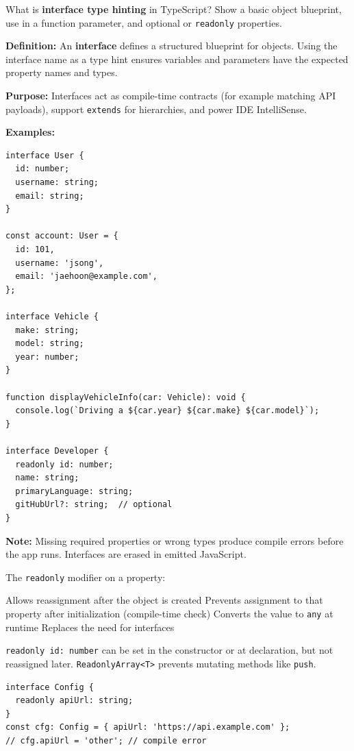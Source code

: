 \question[6]
What is \textbf{interface type hinting} in TypeScript? Show a basic object blueprint, use in a function parameter, and optional or \lstinline[style=tsinline]|readonly| properties.
\begin{solutionorbox}[5in]
\textbf{Definition:} An \textbf{interface} defines a structured blueprint for objects. Using the interface name as a type hint ensures variables and parameters have the expected property names and types.

\textbf{Purpose:} Interfaces act as compile-time contracts (for example matching API payloads), support \lstinline[style=tsinline]|extends| for hierarchies, and power IDE IntelliSense.

\textbf{Examples:}
\begin{lstlisting}[style=ts]
interface User {
  id: number;
  username: string;
  email: string;
}

const account: User = {
  id: 101,
  username: 'jsong',
  email: 'jaehoon@example.com',
};

interface Vehicle {
  make: string;
  model: string;
  year: number;
}

function displayVehicleInfo(car: Vehicle): void {
  console.log(`Driving a ${car.year} ${car.make} ${car.model}`);
}

interface Developer {
  readonly id: number;
  name: string;
  primaryLanguage: string;
  gitHubUrl?: string;  // optional
}
\end{lstlisting}

\textbf{Note:} Missing required properties or wrong types produce compile errors before the app runs. Interfaces are erased in emitted JavaScript.
\end{solutionorbox}



\newpage




\question[4]
The \lstinline[style=tsinline]|readonly| modifier on a property:
\begin{choices}
  \choice Allows reassignment after the object is created
  \CorrectChoice Prevents assignment to that property after initialization (compile-time check)
  \choice Converts the value to \lstinline[style=tsinline]|any| at runtime
  \choice Replaces the need for interfaces
\end{choices}
\begin{solution}
  \lstinline[style=tsinline]|readonly id: number| can be set in the constructor or at declaration, but not reassigned later. \lstinline[style=tsinline]|ReadonlyArray<T>| prevents mutating methods like \lstinline[style=tsinline]|push|.
\begin{lstlisting}[style=ts]
interface Config {
  readonly apiUrl: string;
}
const cfg: Config = { apiUrl: 'https://api.example.com' };
// cfg.apiUrl = 'other'; // compile error
\end{lstlisting}
\end{solution}

